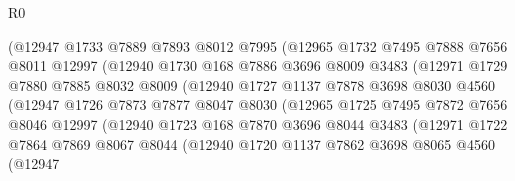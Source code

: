\begin{lexlean}{R0}
\begin{coremodule}
                      (@12947
                        @1733
                        @7889
                        @7893
                        @8012
                        @7995
                        (@12965
                          @1732
                          @7495
                          @7888
                          @7656
                          @8011
                          @12997
                          (@12940
                            @1730
                            @168
                            @7886
                            @3696
                            @8009
                            @3483
                            (@12971
                              @1729
                              @7880
                              @7885
                              @8032
                              @8009
                              (@12940
                                @1727
                                @1137
                                @7878
                                @3698
                                @8030
                                @4560
                                (@12947
                                  @1726
                                  @7873
                                  @7877
                                  @8047
                                  @8030
                                  (@12965
                                    @1725
                                    @7495
                                    @7872
                                    @7656
                                    @8046
                                    @12997
                                    (@12940
                                      @1723
                                      @168
                                      @7870
                                      @3696
                                      @8044
                                      @3483
                                      (@12971
                                        @1722
                                        @7864
                                        @7869
                                        @8067
                                        @8044
                                        (@12940
                                          @1720
                                          @1137
                                          @7862
                                          @3698
                                          @8065
                                          @4560
                                          (@12947

\end{coremodule}
\end{lexlean}
